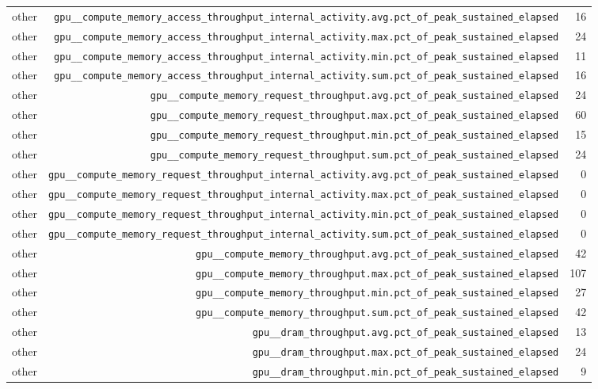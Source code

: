 \begin{table}[h]
\begin{tabular}{|l|r|r|}
other & \texttt{gpu__compute_memory_access_throughput_internal_activity.avg.pct_of_peak_sustained_elapsed} & 16 \\
other & \texttt{gpu__compute_memory_access_throughput_internal_activity.max.pct_of_peak_sustained_elapsed} & 24 \\
other & \texttt{gpu__compute_memory_access_throughput_internal_activity.min.pct_of_peak_sustained_elapsed} & 11 \\
other & \texttt{gpu__compute_memory_access_throughput_internal_activity.sum.pct_of_peak_sustained_elapsed} & 16 \\
other & \texttt{gpu__compute_memory_request_throughput.avg.pct_of_peak_sustained_elapsed} & 24 \\
other & \texttt{gpu__compute_memory_request_throughput.max.pct_of_peak_sustained_elapsed} & 60 \\
other & \texttt{gpu__compute_memory_request_throughput.min.pct_of_peak_sustained_elapsed} & 15 \\
other & \texttt{gpu__compute_memory_request_throughput.sum.pct_of_peak_sustained_elapsed} & 24 \\
other & \texttt{gpu__compute_memory_request_throughput_internal_activity.avg.pct_of_peak_sustained_elapsed} & 0 \\
other & \texttt{gpu__compute_memory_request_throughput_internal_activity.max.pct_of_peak_sustained_elapsed} & 0 \\
other & \texttt{gpu__compute_memory_request_throughput_internal_activity.min.pct_of_peak_sustained_elapsed} & 0 \\
other & \texttt{gpu__compute_memory_request_throughput_internal_activity.sum.pct_of_peak_sustained_elapsed} & 0 \\
other & \texttt{gpu__compute_memory_throughput.avg.pct_of_peak_sustained_elapsed} & 42 \\
other & \texttt{gpu__compute_memory_throughput.max.pct_of_peak_sustained_elapsed} & 107 \\
other & \texttt{gpu__compute_memory_throughput.min.pct_of_peak_sustained_elapsed} & 27 \\
other & \texttt{gpu__compute_memory_throughput.sum.pct_of_peak_sustained_elapsed} & 42 \\
other & \texttt{gpu__dram_throughput.avg.pct_of_peak_sustained_elapsed} & 13 \\
other & \texttt{gpu__dram_throughput.max.pct_of_peak_sustained_elapsed} & 24 \\
other & \texttt{gpu__dram_throughput.min.pct_of_peak_sustained_elapsed} & 9 \\

\end{tabular}
\end{table}
